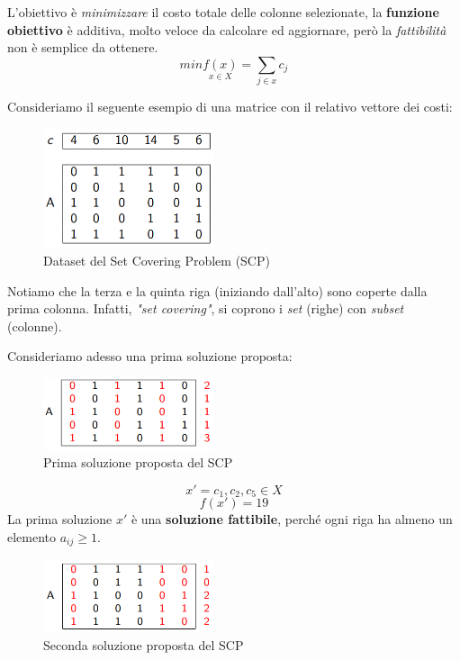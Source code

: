 \documentclass{article}
\begin{document}
L'obiettivo è \textit{minimizzare} il costo totale delle colonne selezionate, la \textbf{funzione obiettivo}
è additiva, molto veloce da calcolare ed aggiornare, però la \textit{fattibilità} non è
semplice da ottenere.
$$min\underset{x\in X}{f(x)}=\sum_{j\in x}c_j$$

Consideriamo il seguente esempio di una matrice con il relativo vettore dei costi:

\begin{figure}[H]
    \centering
    \includegraphics[width=5cm]{images/SCP_datasets.png}
    \caption{Dataset del Set Covering Problem (SCP)}
    \label{fig:dataset_SCP}
\end{figure}
Notiamo che la terza e la quinta riga (iniziando dall'alto) sono coperte dalla prima
colonna. Infatti, \textit{"set covering"}, si coprono i \textit{set} (righe) con
\textit{subset} (colonne).

Consideriamo adesso una prima soluzione proposta:
\begin{figure}[H]
    \centering
    \includegraphics[width=5cm]{images/SCP_first_sol.png}
    \caption{Prima soluzione proposta del SCP}
    \label{fig:sol1_SCP}
\end{figure}

$$x'={c_1,c_2,c_5 }\in X$$
$$f(x')=19$$
La prima soluzione $x'$ è una \textbf{soluzione fattibile}, perché ogni riga ha almeno un elemento
$a_{ij}\geq 1$.

\begin{figure}[H]
    \centering
    \includegraphics[width=5cm]{images/SCP_snd_sol.png}
    \caption{Seconda soluzione proposta del SCP}
    \label{fig:sol2_SCP}
\end{figure}
\end{document}
